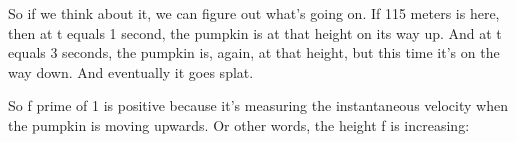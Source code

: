 \documentclass[pdftex, brazil, 12pt, twoside]{article}
\begin{document}
\begin{figure}[H]
  \begin{center}
  \end{center}
\end{figure}

So if we think about it, we can figure out what's going on.
If 115 meters is here, then at t equals 1 second,
the pumpkin is at that height on its way up.
And at t equals 3 seconds, the pumpkin
is, again, at that height, but this time it's on the way down.
And eventually it goes splat.

So f prime of 1 is positive because it's
measuring the instantaneous velocity when
the pumpkin is moving upwards.
Or other words, the height f is increasing:

\begin{figure}[H]
  \begin{center}
  \end{center}
\end{figure}
\end{document}
